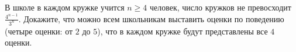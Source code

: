 В школе в каждом кружке учится $n\ge 4$ человек, число кружков не превосходит $\frac{4^{n - 1}}{3^n}$. Докажите, что можно
всем школьникам выставить оценки по поведению (четыре оценки: от $2$ до $5$), что в каждом кружке будут представлены все $4$
оценки.